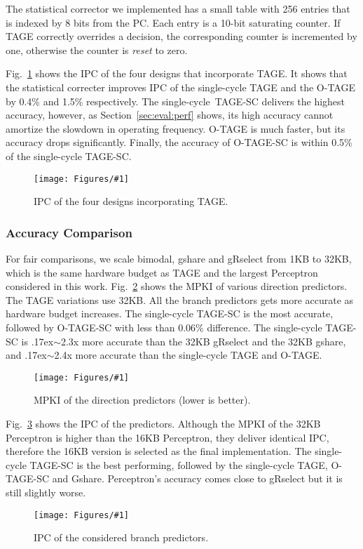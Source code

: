\documentclass[conference]{IEEEtran}
\newcommand{\mytilde}{{\raise.17ex\hbox{$\scriptstyle\sim$}}}
\newcommand{\kfig}[4]{ %
        \begin{figure}[!t]
        \centering
        \texttt{[image: Figures/\#1]}
        \vspace{-1mm}
        \caption{#3}
        \label{#2}
        \end{figure}
}
\begin{document}
The statistical corrector we implemented has a small table with 256 entries that is indexed by 8 bits from the PC. Each entry is a 10-bit saturating counter. If TAGE correctly overrides a decision, the corresponding counter is incremented by one, otherwise the counter is \textit{reset} to zero.

Fig.~\ref{fig:tageIPC} shows the IPC of the four designs that incorporate TAGE. It shows that the statistical correcter improves IPC of the single-cycle TAGE and the \mbox{O-TAGE} by 0.4\% and 1.5\% respectively. The \mbox{single-cycle TAGE-SC} delivers the highest accuracy, however, as Section~\ref{sec:eval:perf} shows, its high accuracy cannot amortize the slowdown in operating frequency. \mbox{O-TAGE} is much faster, but its accuracy drops significantly. Finally, the accuracy of \mbox{O-TAGE-SC} is within 0.5\% of the single-cycle \mbox{TAGE-SC}.
\kfig{tageIPC.pdf}{fig:tageIPC}{IPC of the four designs incorporating TAGE.}{angle = 0, trim = 1.1in 2.4in 0.9in 2.4in, clip, width=0.4\textwidth}


\subsubsection{Accuracy Comparison}
\label{sec:eval:ipc:comparison}
For fair comparisons, we scale bimodal, gshare and gRselect from 1KB to 32KB, which is the same hardware budget as TAGE and the largest Perceptron considered in this work. Fig.~\ref{fig:admpki} shows the MPKI of various direction predictors. The TAGE variations use 32KB. All the branch predictors gets more accurate as hardware budget increases. The single-cycle \mbox{TAGE-SC} is the most accurate, followed by \mbox{O-TAGE-SC} with less than 0.06\% difference. The single-cycle \mbox{TAGE-SC} is \mytilde 2.3x more accurate than the 32KB gRselect and the 32KB gshare, and \mytilde 2.4x more accurate than the single-cycle TAGE and \mbox{O-TAGE}.
\kfig{admpki.pdf}{fig:admpki}{MPKI of the direction predictors (lower is better).}{angle = 0, trim = 0.9in 2.7in 0.8in 2.7in, clip, width=0.5\textwidth}

Fig.~\ref{fig:adipc} shows the IPC of the predictors. Although the MPKI of the 32KB Perceptron is higher than the 16KB Perceptron, they deliver identical IPC, therefore the 16KB version is selected as the final implementation. The single-cycle \mbox{TAGE-SC} is the best performing, followed by the single-cycle TAGE, \mbox{O-TAGE-SC} and Gshare. Perceptron's accuracy comes close to gRselect but it is still slightly worse.
\kfig{adipc.pdf}{fig:adipc}{IPC of the considered branch predictors.}{angle = 0, trim = 0.9in 2.9in 0.8in 2.9in, clip, width=0.5\textwidth}
\end{document}
